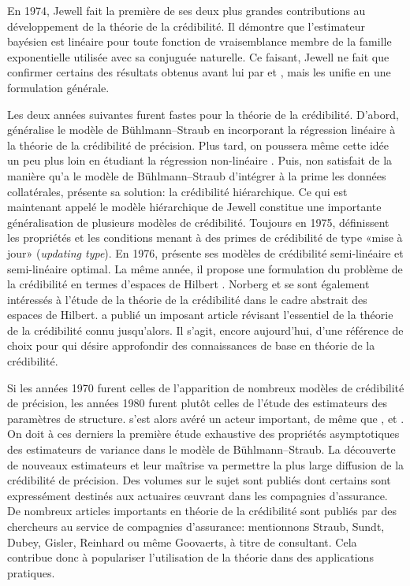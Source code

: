 En 1974, Jewell fait la première de ses deux plus grandes
contributions au développement de la théorie de la crédibilité. Il
démontre \citep{Jewell:exact:1974} que l'estimateur bayésien est
linéaire pour toute fonction de vraisemblance membre de la famille
exponentielle utilisée avec sa conjuguée naturelle. Ce faisant, Jewell
ne fait que confirmer certains des résultats obtenus avant lui par
\cite{Bailey:1950} et \cite{Mayerson:bayesian:1964}, mais les unifie
en une formulation générale.

Les deux années suivantes furent fastes pour la théorie de la
crédibilité. D'abord, \cite{Hachemeister:1975} généralise le modèle de
Bühlmann--Straub en incorporant la régression linéaire à la théorie de
la crédibilité de précision. Plus tard, on poussera même cette idée un
peu plus loin en étudiant la régression non-linéaire
\citep{DeVylder:non-linear:1985}. Puis, non satisfait de la manière
qu'a le modèle de Bühlmann--Straub d'intégrer à la prime les données
collatérales, \cite{Jewell:hierarchical:1975} présente sa solution: la
crédibilité hiérarchique. Ce qui est maintenant appelé le modèle
hiérarchique de Jewell constitue une importante généralisation de
plusieurs modèles de crédibilité. Toujours en 1975,
\cite{Gerber:updating:1975} définissent les propriétés et les
conditions menant à des primes de crédibilité de type «mise à jour»
(\emph{updating type}). En 1976, \citep{DeVylder:semilinear:1976}
présente ses modèles de crédibilité semi-linéaire et semi-linéaire
optimal. La même année, il propose une formulation du problème de la
crédibilité en termes d'espaces de Hilbert
\citep{DeVylder:geometrical:1976}. Norberg et
\cite{Taylor:abstractcredibility:1977} se sont également intéressés à
l'étude de la théorie de la crédibilité dans le cadre abstrait des
espaces de Hilbert. \cite{Norberg:credibility:1979} a publié un imposant
article révisant l'essentiel de la théorie de la crédibilité connu
jusqu'alors. Il s'agit, encore aujourd'hui, d'une référence de choix
pour qui désire approfondir des connaissances de base en théorie de la
crédibilité.

Si les années 1970 furent celles de l'apparition de nombreux modèles de
crédibilité de précision, les années 1980 furent plutôt celles de
l'étude des estimateurs des paramètres de structure.
\cite{DeVylder:estimation:1978,DeVylder:estimation:1981,DeVylder:estimation:PCiI:1984}
s'est alors avéré un acteur important, de même que
\cite{Norberg:empiricalbayes:1980}, \cite{Gisler:trimming:1980} et
\cite{Dubey:estimation:1981}. On doit à ces derniers la première étude
exhaustive des propriétés asymptotiques des estimateurs de variance
dans le modèle de Bühlmann--Straub. La découverte de nouveaux
estimateurs et leur maîtrise va permettre la plus large diffusion de
la crédibilité de précision. Des volumes sur le sujet sont publiés
\citep{Goovaerts:EAM:1990} dont certains
\citep{Goovaerts:credibility:1987} sont expressément destinés aux
actuaires {\oe}uvrant dans les compagnies d'assurance. De nombreux
articles importants en théorie de la crédibilité sont publiés par des
chercheurs au service de compagnies d'assurance: mentionnons Straub,
Sundt, Dubey, Gisler, Reinhard ou même Goovaerts, à titre de
consultant. Cela contribue donc à populariser l'utilisation de la
théorie dans des applications pratiques.

